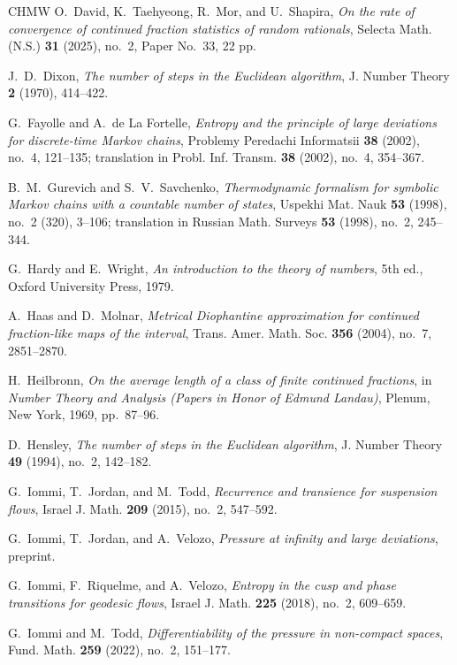 \documentclass[letterpaper,11pt]{amsart}
\numberwithin{equation}{section}     %
\begin{document}
\begin{thebibliography}{CHMW}
O.~David, K.~Taehyeong, R.~Mor, and U.~Shapira,
\emph{On the rate of convergence of continued fraction statistics of random rationals},
Selecta Math. (N.S.) \textbf{31} (2025), no.~2, Paper No.~33, 22 pp.

J.~D.~Dixon,
\emph{The number of steps in the Euclidean algorithm},
J. Number Theory \textbf{2} (1970), 414--422.

G.~Fayolle and A.~de La Fortelle,
\emph{Entropy and the principle of large deviations for discrete-time Markov chains},
Problemy Peredachi Informatsii \textbf{38} (2002), no.~4, 121--135;
translation in Probl. Inf. Transm. \textbf{38} (2002), no.~4, 354--367.

B.~M.~Gurevich and S.~V.~Savchenko,
\emph{Thermodynamic formalism for symbolic Markov chains with a countable number of states},
Uspekhi Mat. Nauk \textbf{53} (1998), no.~2 (320), 3--106;
translation in Russian Math. Surveys \textbf{53} (1998), no.~2, 245--344.

G.~Hardy and E.~Wright,
\emph{An introduction to the theory of numbers},
5th ed., Oxford University Press, 1979.

A.~Haas and D.~Molnar,
\emph{Metrical Diophantine approximation for continued fraction-like maps of the interval},
Trans. Amer. Math. Soc. \textbf{356} (2004), no.~7, 2851--2870.

H.~Heilbronn,
\emph{On the average length of a class of finite continued fractions},
in \emph{Number Theory and Analysis (Papers in Honor of Edmund Landau)},
Plenum, New York, 1969, pp.~87--96.

D.~Hensley,
\emph{The number of steps in the Euclidean algorithm},
J. Number Theory \textbf{49} (1994), no.~2, 142--182.

G.~Iommi, T.~Jordan, and M.~Todd,
\emph{Recurrence and transience for suspension flows},
Israel J. Math. \textbf{209} (2015), no.~2, 547--592.

G.~Iommi, T.~Jordan, and A.~Velozo,
\emph{Pressure at infinity and large deviations},
preprint.

G.~Iommi, F.~Riquelme, and A.~Velozo,
\emph{Entropy in the cusp and phase transitions for geodesic flows},
Israel J. Math. \textbf{225} (2018), no.~2, 609--659.

G.~Iommi and M.~Todd,
\emph{Differentiability of the pressure in non-compact spaces},
Fund. Math. \textbf{259} (2022), no.~2, 151--177.


\end{thebibliography}
\end{document}
